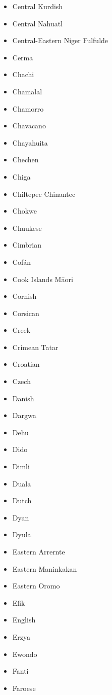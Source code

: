 \documentclass[paper=a4, 12pt]{scrbook}
\begin{document}
\begin{multicols}{3}
\begin{itemize}
        \item Central Kurdish
        \item Central Nahuatl
        \item Central-Eastern Niger Fulfulde
        \item Cerma
        \item Chachi
        \item Chamalal
        \item Chamorro
        \item Chavacano
        \item Chayahuita
        \item Chechen
        \item Chiga
        \item Chiltepec Chinantec
        \item Chokwe
        \item Chuukese
        \item Cimbrian
        \item Cofán
        \item Cook Islands Māori
        \item Cornish
        \item Corsican
        \item Creek
        \item Crimean Tatar
        \item Croatian
        \item Czech
        \item Danish
        \item Dargwa
        \item Dehu
        \item Dido
        \item Dimli
        \item Duala
        \item Dutch
        \item Dyan
        \item Dyula
        \item Eastern Arrernte
        \item Eastern Maninkakan
        \item Eastern Oromo
        \item Efik
        \item English
        \item Erzya
        \item Ewondo
        \item Fanti
        \item Faroese

\end{itemize}
\end{multicols}
\end{document}
